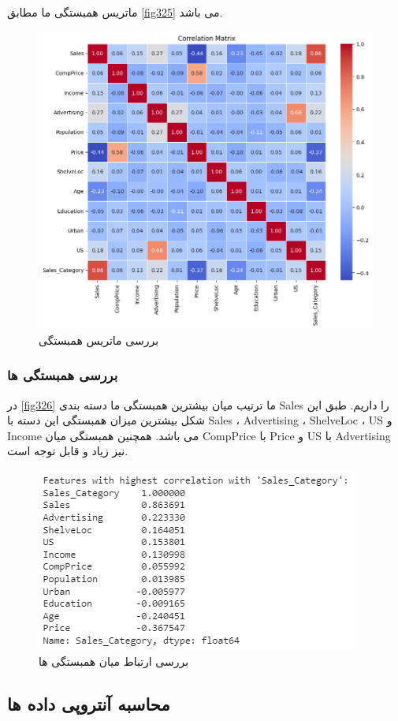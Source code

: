 \documentclass{article}
\begin{document}
ماتریس همبستگی ما مطابق \autoref{fig325} می باشد.

\begin{figure}[h!]
    \centering
    \includegraphics[width=0.8\linewidth]{q3_p25.png}
    \caption{بررسی ماتریس همبستگی}
    \label{fig325}
\end{figure}


\subsubsection{بررسی همبستگی ها}

در \autoref{fig326} ما ترتیب میان بیشترین همبستگی ما دسته بندی Sales را داریم. طبق این شکل بیشترین میزان همبستگی این دسته با Sales ، Advertising ، ShelveLoc ، US و Income می باشد. همچنین همبستگی میان CompPrice با Price و US با Advertising نیز زیاد و قابل توجه است.

\begin{figure}[h!]
    \centering
    \includegraphics[width=0.6\linewidth]{q3_p26.png}
    \caption{بررسی ارتباط میان همبستگی ها}
    \label{fig326}
\end{figure}


\subsection{محاسبه آنتروپی داده ها}
\end{document}
